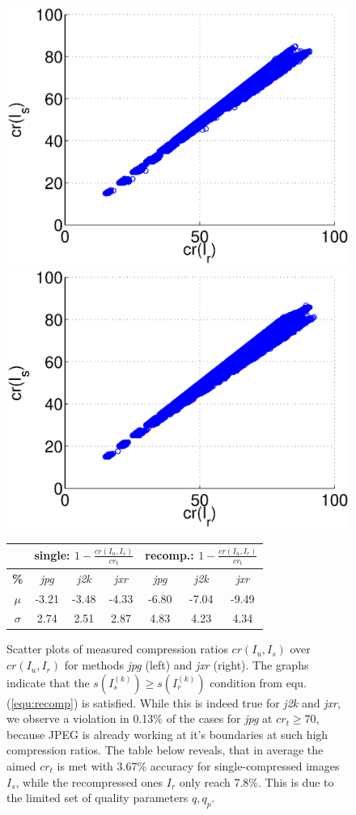 \documentclass[10pt,twocolumn,letterpaper]{article}
\begin{document}
\begin{figure}
	\begin{small}
	
	\includegraphics[width=0.45\linewidth]{img/jpgData.eps}
	\includegraphics[width=0.45\linewidth]{img/jxrData.eps}
	
	\vspace{3mm}
	\begin{tabular}{c|c|c|c||c|c|c}
		& \multicolumn{3}{c||}{single: $1-\frac{cr(I_u, I_s)}{cr_t}$ } & \multicolumn{3}{c}{recomp.: $ 1-\frac{cr(I_u, I_r)}{cr_t}$} \\
		\hline
		\textbf{\%} & \emph{jpg} & \emph{j2k} & \emph{jxr} & \emph{jpg} & \emph{j2k} & \emph{jxr} \\
		\hline
		$ \mu $ & -3.21 & -3.48	&  -4.33 &  -6.80&   -7.04 &   -9.49 \\
		$ \sigma$ &2.74 &2.51 &  2.87 & 4.83  & 4.23  & 4.34 \\
	\end{tabular}
	
	
	\vspace{2mm}
	
	\end{small}
	
	\caption{Scatter plots of measured compression ratios $cr(I_u, I_s)$ over $cr(I_u, I_r)$ for methods \emph{jpg} (left) and \emph{jxr} (right). The graphs indicate that the $s(I_s^{(k)}) \geq s(I_r^{(k)})$ condition from equ. (\ref{equ:recomp}) is satisfied. While this is indeed true for \emph{j2k} and \emph{jxr}, we observe a violation in 0.13\% of the cases for \emph{jpg} at $cr_t \geq 70$, because JPEG is already working at it's boundaries at such high compression ratios. The table below reveals, that in average the aimed $cr_t$ is met with 3.67\% accuracy for single-compressed images $I_s$, while the recompressed ones $I_r$ only reach 7.8\%. This is due to the limited set of quality parameters $q, q_p$.}
	
	
	\label{fig:dataDistribution}
\end{figure}
\end{document}
